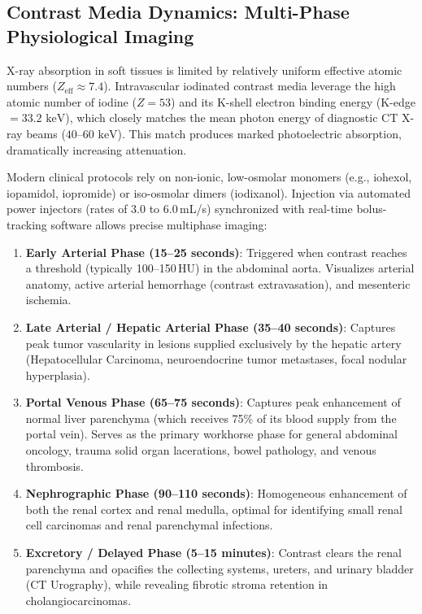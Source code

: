 \documentclass[11pt,a4paper]{article}
\begin{document}
\subsection{Contrast Media Dynamics: Multi-Phase Physiological Imaging}
X-ray absorption in soft tissues is limited by relatively uniform effective atomic numbers ($Z_{\text{eff}} \approx 7.4$). Intravascular iodinated contrast media leverage the high atomic number of iodine ($Z=53$) and its K-shell electron binding energy (K-edge $= 33.2\text{ keV}$), which closely matches the mean photon energy of diagnostic CT X-ray beams ($40\text{--}60\text{ keV}$). This match produces marked photoelectric absorption, dramatically increasing attenuation.

Modern clinical protocols rely on non-ionic, low-osmolar monomers (e.g., iohexol, iopamidol, iopromide) or iso-osmolar dimers (iodixanol). Injection via automated power injectors (rates of 3.0 to 6.0\,mL/s) synchronized with real-time bolus-tracking software allows precise multiphase imaging:
\begin{enumerate}[leftmargin=*]
    \item \textbf{Early Arterial Phase (15--25 seconds)}: Triggered when contrast reaches a threshold (typically 100--150\,HU) in the abdominal aorta. Visualizes arterial anatomy, active arterial hemorrhage (contrast extravasation), and mesenteric ischemia.
    \item \textbf{Late Arterial / Hepatic Arterial Phase (35--40 seconds)}: Captures peak tumor vascularity in lesions supplied exclusively by the hepatic artery (Hepatocellular Carcinoma, neuroendocrine tumor metastases, focal nodular hyperplasia).
    \item \textbf{Portal Venous Phase (65--75 seconds)}: Captures peak enhancement of normal liver parenchyma (which receives 75\% of its blood supply from the portal vein). Serves as the primary workhorse phase for general abdominal oncology, trauma solid organ lacerations, bowel pathology, and venous thrombosis.
    \item \textbf{Nephrographic Phase (90--110 seconds)}: Homogeneous enhancement of both the renal cortex and renal medulla, optimal for identifying small renal cell carcinomas and renal parenchymal infections.
    \item \textbf{Excretory / Delayed Phase (5--15 minutes)}: Contrast clears the renal parenchyma and opacifies the collecting systems, ureters, and urinary bladder (CT Urography), while revealing fibrotic stroma retention in cholangiocarcinomas.
\end{enumerate}
\end{document}
